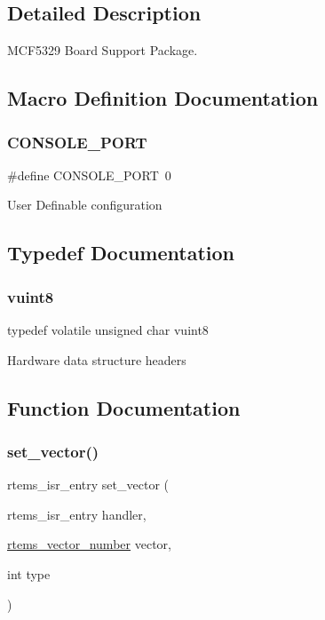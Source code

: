 \subsection{Detailed Description}
M\+C\+F5329 Board Support Package. 



\subsection{Macro Definition Documentation}
\mbox{\label{group__RTEMSBSPsM68kMCF5329_ga0859abd84f64f7f09ad95a4079b06f41}} 
\subsubsection{\texorpdfstring{CONSOLE\_PORT}{CONSOLE\_PORT}}
{\footnotesize\ttfamily \#define C\+O\+N\+S\+O\+L\+E\+\_\+\+P\+O\+RT~0}

User Definable configuration 

\subsection{Typedef Documentation}
\mbox{\label{group__RTEMSBSPsM68kMCF5329_gab2208c2cec6d83509a16c4b4e177bc20}} 
\subsubsection{\texorpdfstring{vuint8}{vuint8}}
{\footnotesize\ttfamily typedef volatile unsigned char vuint8}

Hardware data structure headers 

\subsection{Function Documentation}
\mbox{\label{group__RTEMSBSPsM68kMCF5329_gab3388042c56b34c40be81fd5f028d97e}} 
\subsubsection{\texorpdfstring{set\_vector()}{set\_vector()}}
{\footnotesize\ttfamily rtems\+\_\+isr\+\_\+entry set\+\_\+vector (\begin{DoxyParamCaption}\item[{rtems\+\_\+isr\+\_\+entry}]{handler,  }\item[{\mbox{\hyperlink{group__ClassicINTR_ga3e434c197d99f128e78cae4d9358bd8b}{rtems\+\_\+vector\+\_\+number}}}]{vector,  }\item[{int}]{type }\end{DoxyParamCaption})}



